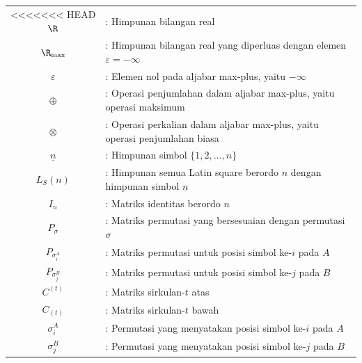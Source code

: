 \renewcommand{\arraystretch}{1.4}
\begin{longtable}{c p{14cm}}
<<<<<<< HEAD
  $\R$                       & : Himpunan bilangan real                                                                           \\
  $\R_{\max}$                & : Himpunan bilangan real yang diperluas dengan elemen $\varepsilon=-\infty$                        \\
  $\varepsilon$              & : Elemen nol pada aljabar max-plus, yaitu $-\infty$                                                \\
  $\oplus$                   & : Operasi penjumlahan dalam aljabar max-plus, yaitu operasi maksimum                               \\
  $\otimes$                  & : Operasi perkalian dalam aljabar max-plus, yaitu operasi penjumlahan biasa                        \\
  $\underline{n}$            & : Himpunan simbol $\{1,2,\ldots,n\}$                                                               \\
  $L_S(n)$                   & : Himpunan semua Latin square berordo $n$ dengan himpunan simbol $\underline{n}$                   \\
  $I_n$                      & : Matriks identitas berordo $n$                                                                    \\
  $P_\sigma$                 & : Matriks permutasi yang bersesuaian dengan permutasi $\sigma$                                     \\
  $P_{\sigma_i^A}$           & : Matriks permutasi untuk posisi simbol ke-$i$ pada $A$                                            \\
  $P_{\sigma_j^B}$           & : Matriks permutasi untuk posisi simbol ke-$j$ pada $B$                                            \\
  $C^{(t)}$                  & : Matriks sirkulan-$t$ atas                                                                        \\
  $C_{(t)}$                  & : Matriks sirkulan-$t$ bawah                                                                       \\
  $\sigma_i^A$               & : Permutasi yang menyatakan posisi simbol ke-$i$ pada $A$                                          \\
  $\sigma_j^B$               & : Permutasi yang menyatakan posisi simbol ke-$j$ pada $B$                                          \\

\end{longtable}

